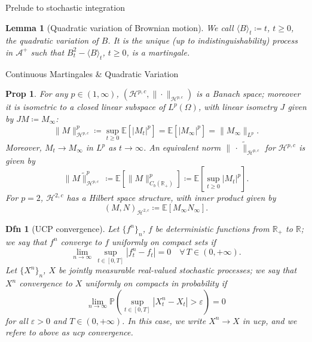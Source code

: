 \documentclass[a4paper]{article}
\theoremstyle{mytheoremstyle}
\newtheorem{definition}{Dfn}
\newtheorem{lemma}{Lemma}
\newtheorem{proposition}{Prop}
\newcommand{\1}{\mathds{1}}
\begin{document}
\begin{multicols*}{3}
\begin{roundbox}{Prelude to stochastic integration}
\begin{lemma}[Quadratic variation of Brownian motion]
  We call $\langle B \rangle_t \coloneq t$, $t \geqslant 0$, the
  {\emph{quadratic variation}} of $B$. It is the unique (up to
  indistinguishability) process in $\mathcal{A}^+$ such that $B^2_t - \langle
  B \rangle_t$, $t \geqslant 0$, is a martingale.
\end{lemma}
\end{roundbox}

\begin{roundbox}{Continuous Martingales \& Quadratic Variation}
\begin{proposition}
  \label{prop:martingale.space.Hpc}For any $p \in (1, \infty)$,
  $(\mathcal{H}^{p, c}, \| \cdot \|_{\mathcal{H}^{p, c}})$ is a Banach space;
  moreover it is isometric to a closed linear subspace of $L^p (\Omega)$, with
  linear isometry $J$ given by $J M \coloneq M_{\infty}$:
  \[ \| M \|_{\mathcal{H}^{p, c}}^p \coloneq \sup_{t \geqslant 0} \mathbb{E} [|
     M_t |^p] =\mathbb{E} [| M_{\infty} |^p] = \| M_{\infty} \|_{L^p} . \]
  Moreover, $M_t \rightarrow M_{\infty}$ in $L^p$ as $t \rightarrow \infty$.
  An equivalent norm $\| \, \cdot \, \tilde{\|}_{\mathcal{H}^{p, c}}$ for
  $\mathcal{H}^{p, c}$ is given by
  \[
    \|M \tilde{\|}_{\mathcal{H}^{p, c}}^p \, \coloneq \mathbb{E} \left[\| M \|_{C_b
     (\mathbb{R}_+)}^p \right] \coloneq \mathbb{E} \left[\sup_{t \geqslant 0} | M_t |^p \right] .
  \]
  For $p = 2$, $\mathcal{H}^{2, c}$ has a Hilbert space structure, with inner
  product given by
  \begin{equation}
    (M, N)_{\mathcal{H}^{2, c}} \coloneq \mathbb{E} [M_{\infty} N_{\infty}] .
    \label{eq:inner.product.H2c}
  \end{equation}
\end{proposition}

\begin{definition}[UCP convergence]
  \label{defn:ucp}Let $\{ f^n \}_n$, $f$ be deterministic functions from
  $\mathbb{R}_+$ to $\mathbb{R}$; we say that $f^n$ converge to $f$
  {\emph{uniformly on compact sets}} if
  \[ \lim_{n \rightarrow \infty} \, \sup_{t \in [0, T]} | f^n_t - f_t | = 0
     \quad \forall \, T \in (0, + \infty) . \]
  Let $\{ X^n \}_n$, $X$ be jointly measurable real-valued stochastic
  processes; we say that $X^n$ convergence to $X$ {\emph{uniformly on compacts
  in probability}} if
  \[
    \lim_{n \rightarrow \infty} \mathbb{P} \left(\sup_{t \in [0, T]} | X^n_t - X_t
     | > \varepsilon \right) = 0
  \]
  for all $\varepsilon > 0$ and $T \in (0, + \infty)$. In this case, we write
  $X^n \rightarrow X$ in {\emph{ucp}}, and we refere to above as {\emph{ucp
  convergence}}.
\end{definition}


\end{roundbox}
\end{multicols*}
\end{document}
